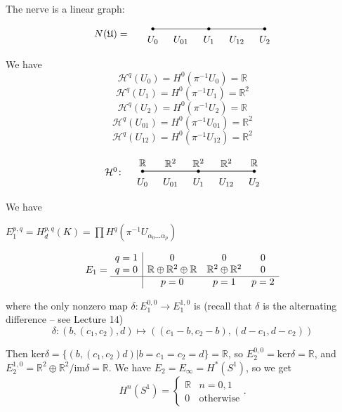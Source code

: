 \documentclass{article}
\theoremstyle{mystyle}
\theoremstyle{remark}
\numberwithin{equation}{section}
\begin{document}
The nerve is a linear graph:

$$\begin{tikzpicture}
\node () at (-3.5,0.0) {$N(\mathfrak{U}) = $};
\draw (-2,0.2)--(2,0.2);
\node () at (-2,-0.2) {$U_0$};
\node () at (-1,-0.2) {$U_{01}$};
\node () at (0,-0.2) {$U_1$};
\node () at (1,-0.2) {$U_{12}$};
\node () at (2,-0.2) {$U_2$};
\draw[fill=black] (-2,0.2) circle (0.05);
\draw[fill=black] (0,0.2) circle (0.05);
\draw[fill=black] (2,0.2) circle (0.05);
\end{tikzpicture}
$$

We have
$$\mathcal{H}^q(U_0) = H^0(\pi^{-1}U_0) = \mathbb{R}$$
$$\mathcal{H}^q(U_1) = H^0(\pi^{-1}U_1) = \mathbb{R}^2$$
$$\mathcal{H}^q(U_2) = H^0(\pi^{-1}U_2) = \mathbb{R}$$
$$\mathcal{H}^q(U_{01}) = H^0(\pi^{-1}U_{01})=\mathbb{R}^2$$
$$\mathcal{H}^q(U_{12}) = H^0(\pi^{-1}U_{12})=\mathbb{R}^2$$

$$
\begin{tikzpicture}
\node () at (-3,0.2) {$\mathcal{H}^0\colon$};
\draw (-2,0.2)--(2,0.2);
\node () at (-2,0.5) {$\mathbb{R}$};
\node () at (-1,0.5) {$\mathbb{R}^2$};
\node () at (0,0.5) {$\mathbb{R}^2$};
\node () at (1,0.5) {$\mathbb{R}^2$};
\node () at (2,0.5) {$\mathbb{R}$};
\draw (-2,0.2)--(2,0.2);
\node () at (-2,-0.2) {$U_0$};
\node () at (-1,-0.2) {$U_{01}$};
\node () at (0,-0.2) {$U_1$};
\node () at (1,-0.2) {$U_{12}$};
\node () at (2,-0.2) {$U_2$};
\draw[fill=black] (-2,0.2) circle (0.05);
\draw[fill=black] (0,0.2) circle (0.05);
\draw[fill=black] (2,0.2) circle (0.05);
\end{tikzpicture}
$$

We have

$E_1^{p,q} = H_d^{p,q}(K) = \prod H^q(\pi^{-1}U_{\alpha_0...\alpha_p})$

$$E_1 = \begin{array}{c|ccc}
q=1 & 0 & 0 & 0\\
q=0 & \mathbb{R}\oplus \mathbb{R}^2\oplus \mathbb{R} & \mathbb{R}^2\oplus \mathbb{R}^2 & 0\\
\hline
&p=0 & p=1 & p=2 \end{array}$$

where the only nonzero map $\delta\colon E_1^{0,0}\rightarrow E_1^{1,0}$ is (recall that $\delta$ is the alternating difference -- see Lecture 14)
$$\delta\colon (b,(c_1,c_2),d)\mapsto ((c_1-b,c_2-b),(d-c_1,d-c_2))$$

Then $\mathrm{ker}\delta = \{(b,(c_1,c_2)d)|b=c_1=c_2=d\} = \mathbb{R}$, so $E^{0,0}_2 = \mathrm{ker}\delta =  \mathbb{R}$, and $E^{1,0}_2 = \mathbb{R}^2\oplus \mathbb{R}^2/\mathrm{im}\delta = \mathbb{R}$. We have $E_2 = E_\infty = H^*(S^1)$, so we get
$$H^n(S^1) = \left\{\begin{array}{cc} \mathbb{R} & n=0,1\\0 & \text{otherwise}\end{array}\right..$$
\end{document}
